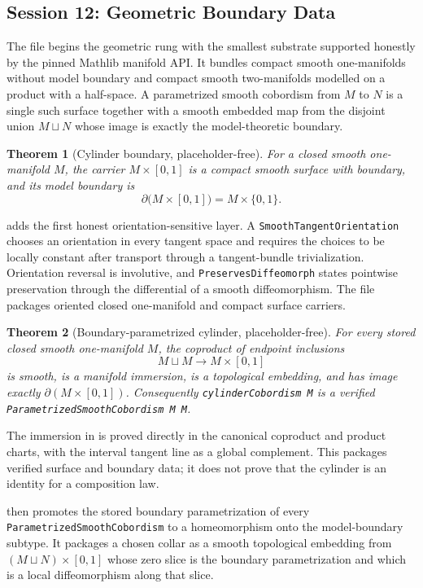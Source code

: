 \documentclass[11pt]{amsart}
\theoremstyle{plain}
\newtheorem{theorem}{Theorem}[section]
\theoremstyle{definition}
\begin{document}
\subsection{Session 12: Geometric Boundary Data}

The file  begins the geometric rung with the smallest substrate supported honestly by the pinned Mathlib manifold API. It bundles compact smooth one-manifolds without model boundary and compact smooth two-manifolds modelled on a product with a half-space. A parametrized smooth cobordism from \(M\) to \(N\) is a single such surface together with a smooth embedded map from the disjoint union $M\sqcup N$ whose image is exactly the model-theoretic boundary.

\begin{theorem}[Cylinder boundary, placeholder-free]
For a closed smooth one-manifold $M$, the carrier $M\times[0,1]$ is a compact smooth surface with boundary, and its model boundary is
\[
\partial\bigl(M\times[0,1]\bigr)
=M\times\{0,1\}.
\]
\end{theorem}

 adds the first honest
orientation-sensitive layer. A \texttt{SmoothTangentOrientation} chooses an
orientation in every tangent space and requires the choices to be locally
constant after transport through a tangent-bundle trivialization. Orientation
reversal is involutive, and \texttt{PreservesDiffeomorph} states pointwise
preservation through the differential of a smooth diffeomorphism. The file
packages oriented closed one-manifold and compact surface carriers.

\begin{theorem}[Boundary-parametrized cylinder, placeholder-free]
For every stored closed smooth one-manifold $M$, the coproduct of endpoint
inclusions
\[
M\sqcup M\longrightarrow M\times[0,1]
\]
is smooth, is a manifold immersion, is a topological embedding, and has image
exactly $\partial(M\times[0,1])$. Consequently
\texttt{cylinderCobordism M} is a verified
\texttt{ParametrizedSmoothCobordism M M}.
\end{theorem}

The immersion in  is proved directly in the
canonical coproduct and product charts, with the interval tangent line as a
global complement. This packages verified surface and boundary data; it does
not prove that the cylinder is an identity for a composition law.

 then promotes the stored boundary
parametrization of every \texttt{ParametrizedSmoothCobordism} to a
homeomorphism onto the model-boundary subtype.  It packages a chosen collar as
a smooth topological embedding from
\((M\sqcup N)\times[0,1]\) whose zero slice is the boundary parametrization
and which is a local diffeomorphism along that slice.
\end{document}
